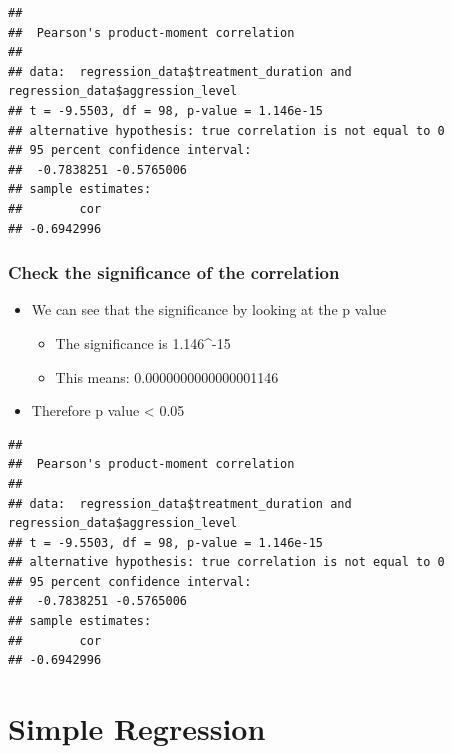 \documentclass[
]{book}
\newenvironment{Shaded}{\begin{snugshade}}{\end{snugshade}}
\newcommand{\KeywordTok}[1]{\textcolor[rgb]{0.13,0.29,0.53}{\textbf{#1}}}
\newcommand{\NormalTok}[1]{#1}
\newcommand{\OperatorTok}[1]{\textcolor[rgb]{0.81,0.36,0.00}{\textbf{#1}}}
\providecommand{\tightlist}{%
  \setlength{\itemsep}{0pt}\setlength{\parskip}{0pt}}
\begin{document}
\begin{verbatim}
## 
##  Pearson's product-moment correlation
## 
## data:  regression_data$treatment_duration and regression_data$aggression_level
## t = -9.5503, df = 98, p-value = 1.146e-15
## alternative hypothesis: true correlation is not equal to 0
## 95 percent confidence interval:
##  -0.7838251 -0.5765006
## sample estimates:
##        cor 
## -0.6942996
\end{verbatim}

\hypertarget{check-the-significance-of-the-correlation}{%
\subsection{Check the significance of the correlation}\label{check-the-significance-of-the-correlation}}

\begin{itemize}
\tightlist
\item
  We can see that the significance by looking at the p value

  \begin{itemize}
  \tightlist
  \item
    The significance is 1.146\^{}-15
  \item
    This means: 0.0000000000000001146
  \end{itemize}
\item
  Therefore p value \textless{} 0.05
\end{itemize}

\begin{Shaded}
\end{Shaded}

\begin{verbatim}
## 
##  Pearson's product-moment correlation
## 
## data:  regression_data$treatment_duration and regression_data$aggression_level
## t = -9.5503, df = 98, p-value = 1.146e-15
## alternative hypothesis: true correlation is not equal to 0
## 95 percent confidence interval:
##  -0.7838251 -0.5765006
## sample estimates:
##        cor 
## -0.6942996
\end{verbatim}

\hypertarget{simple-regression}{%
\chapter{Simple Regression}\label{simple-regression}}
\end{document}
